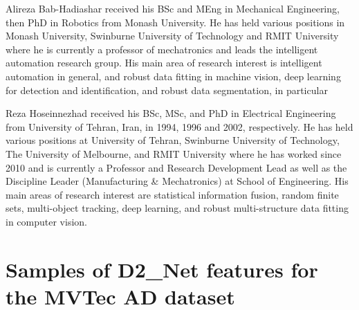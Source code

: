 \documentclass[journal]{IEEEtran}
\begin{document}
\begin{IEEEbiographynophoto}{Alireza Bab-Hadiashar}
received his BSc and MEng in Mechanical
Engineering, then PhD in Robotics from Monash University. He has
held various positions in Monash University, Swinburne University of
Technology and RMIT University where he is currently a professor of
mechatronics and leads the intelligent automation research group.
His main area of research interest is intelligent automation in general,
and robust data fitting in machine vision, deep learning for detection
and identification, and robust data segmentation, in particular
\end{IEEEbiographynophoto}
\begin{IEEEbiographynophoto}{Reza Hoseinnezhad}
received his BSc, MSc, and PhD in Electrical
Engineering from University of Tehran, Iran, in 1994, 1996 and
2002, respectively. He has held various positions at University of
Tehran, Swinburne University of Technology, The University of
Melbourne, and RMIT University where he has worked since 2010
and is currently a Professor and Research Development Lead as
well as the Discipline Leader (Manufacturing \& Mechatronics) at
School of Engineering. His main areas of research interest are
statistical information fusion, random finite sets, multi-object
tracking, deep learning, and robust multi-structure data fitting in
computer vision.
\end{IEEEbiographynophoto}






\appendices
\newpage
\section{Samples of D2\_Net features for the MVTec AD dataset}
\centering

\end{document}
